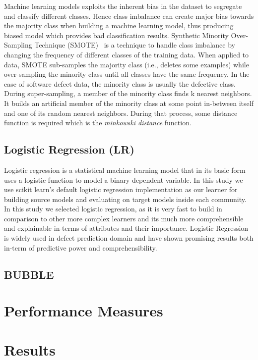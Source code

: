 \documentclass[sigconf]{acmart}
\theoremstyle{break}
\begin{document}
Machine learning models exploits the inherent bias in the dataset to segregate and classify different classes. Hence class imbalance can create major bias towards the majority class when building a machine learning model, thus producing biased model which provides bad classification results. Synthetic Minority Over-Sampling Technique (SMOTE)~\cite{chawla2002smote} is a technique to handle class imbalance by changing the frequency of different classes of the training data. When applied to data, SMOTE sub-samples the majority class (i.e., deletes some examples) while over-sampling the minority class until all classes have the same frequency. In the case of software defect data, the minority class is usually the defective class. During super-sampling, a member of the minority class finds k nearest neighbors. It builds an artificial member of the minority class at some point in-between itself and one of its random nearest neighbors. During that process, some distance function is required which is the \textit{minkowski distance} function.

\subsection{Logistic Regression (LR)}
\label{subsec:LR}

Logistic regression is a statistical machine learning model that in its basic form uses a logistic function to model a binary dependent variable. In this study we use scikit learn's default logistic regression implementation as our learner for building source models and evaluating on target models inside each community. In this study we selected logistic regression, as it is very fast to build in comparison to other more complex learners and its much more comprehensible and explainable in-terms of attributes and their importance. Logistic Regression is widely used in defect prediction domain and have shown promising results both in-term of predictive power and comprehensibility.


\subsection{BUBBLE}
\label{BUBBLE}

\section{Performance Measures}
\label{Performance Measures}

\section{Results}
\label{sec:results}
\end{document}
